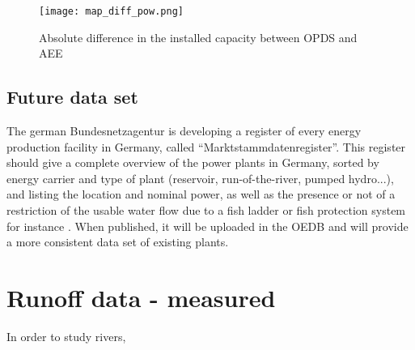 \begin{figure}[H]
\centering
\texttt{[image: map\_diff\_pow.png]}
\caption[Absolute difference in the installed capacity between OPDS and AEE]{Absolute difference in the installed capacity between OPDS and AEE}
\label{map_diff_pow}
\end{figure}


\subsection{Future data set}

The german Bundesnetzagentur is developing a register of every energy production facility in Germany, called ``Marktstammdatenregister''. This register should give a complete overview of the power plants in Germany, sorted by energy carrier and type of plant (reservoir, run-of-the-river, pumped hydro...), and listing the location and nominal power, as well as the presence or not of a restriction of the usable water flow due to a fish ladder or fish protection system for instance \cite{MaStR}. \newline
When published, it will be uploaded in the OEDB and will provide a more consistent data set of existing plants.

\section{Runoff data - measured}

\label{sec:meas_runoff}

In order to study rivers, 


